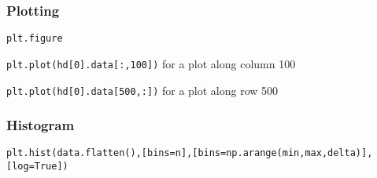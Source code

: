 \documentclass[12pt]{article}
\begin{document}
\subsubsection{Plotting}
\begin{itemize*}
    \item \texttt{plt.figure}
    \item \texttt{plt.plot(hd[0].data[:,100])} for a plot along column 100
    \item \texttt{plt.plot(hd[0].data[500,:])} for a plot along row 500
\end{itemize*}

\subsubsection{Histogram}
\texttt{plt.hist(data.flatten(),[bins=n],[bins=np.arange(min,max,delta)],
[log=True])}
\end{document}
